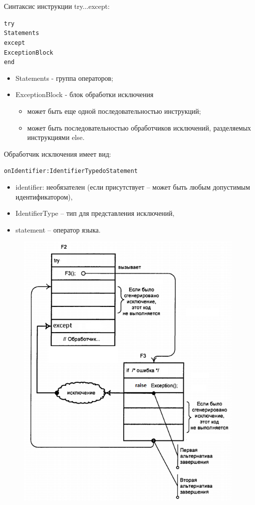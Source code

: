 \documentclass{beamer}
\begin{document}
\begin{frame}[fragile]
Синтаксис инструкции try...except:
\begin{alltt}
try 
  Statements 
except 
  ExceptionBlock 
end
\end{alltt}
\begin{itemize}
\item Statements - группа операторов;
\item ExceptionBlock - блок обработки исключения
\begin{itemize}
\item может быть еще одной последовательностью инструкций;
\item может быть последовательностью обработчиков исключений, разделяемых инструкциями else.
\end{itemize}
\end{itemize}
Обработчик исключения имеет вид:
\begin{alltt}
on Identifier: IdentifierType do Statement
\end{alltt}
\begin{itemize}
\item identifier: необязателен (если присутствует – может быть любым допустимым идентификатором), 
\item IdentifierType – тип для представления исключений, 
\item statement – оператор языка.
\end{itemize}
\end{frame}

\begin{frame}
\begin{figure}[h]
\centering
\includegraphics[scale=0.5]{images/lec08-pic07.png}
\end{figure}
\end{frame}
\end{document}
